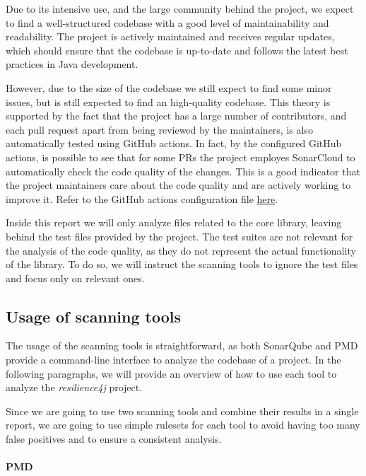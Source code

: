 Due to its intensive use, and the large community behind the project, we expect to find a well-structured codebase with a good level of maintainability and readability. The project is actively maintained and receives regular updates, which should ensure that the codebase is up-to-date and follows the latest best practices in Java development.

However, due to the size of the codebase we still expect to find some minor issues, but is still expected to find an high-quality codebase. This theory is supported by the fact that the project has a large number of contributors, and each pull request apart from being reviewed by the maintainers, is also automatically tested using GitHub actions. In fact, by the configured GitHub actions, is possible to see that for some PRs the project employes SonarCloud to automatically check the code quality of the changes. This is a good indicator that the project maintainers care about the code quality and are actively working to improve it. Refer to the GitHub actions configuration file \href{https://github.com/resilience4j/resilience4j/blob/master/.github/workflows/gradle-build.yml#L54}{here}.

Inside this report we will only analyze files related to the core library, leaving behind the test files provided by the project. The test suites are not relevant for the analysis of the code quality, as they do not represent the actual functionality of the library. To do so, we will instruct the scanning tools to ignore the test files and focus only on relevant ones.

\subsection{Usage of scanning tools}

The usage of the scanning tools is straightforward, as both SonarQube and PMD provide a command-line interface to analyze the codebase of a project. In the following paragraphs, we will provide an overview of how to use each tool to analyze the \textit{resilience4j} project.

Since we are going to use two scanning tools and combine their results in a single report, we are going to use simple rulesets for each tool to avoid having too many false positives and to ensure a consistent analysis.

\paragraph{PMD}
\label{sec:pmd_usage}

